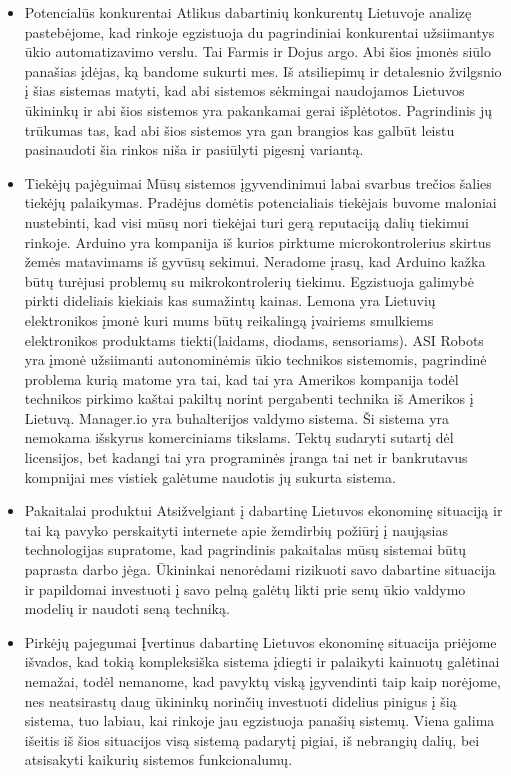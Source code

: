 \documentclass[oneside]{VUMIFPSkursinis}
\begin{document}
	\begin{itemize}
		\item{Potencialūs konkurentai}
Atlikus dabartinių konkurentų Lietuvoje analizę pastebėjome, kad rinkoje egzistuoja du pagrindiniai konkurentai užsiimantys ūkio automatizavimo verslu. Tai Farmis ir Dojus argo. Abi šios įmonės siūlo panašias įdėjas, ką bandome sukurti mes. Iš atsiliepimų ir detalesnio žvilgsnio į šias sistemas matyti, kad abi sistemos sėkmingai naudojamos Lietuvos ūkininkų ir abi šios sistemos yra pakankamai gerai išplėtotos. Pagrindinis jų trūkumas tas, kad abi šios sistemos yra gan brangios kas galbūt leistu pasinaudoti šia rinkos niša ir pasiūlyti pigesnį variantą.
		\item{Tiekėjų pajėguimai}
Mūsų sistemos įgyvendinimui labai svarbus trečios šalies tiekėjų palaikymas. Pradėjus domėtis potencialiais tiekėjais buvome maloniai nustebinti, kad visi mūsų nori tiekėjai turi gerą reputaciją dalių tiekimui rinkoje. Arduino yra kompanija iš kurios pirktume microkontrolerius skirtus žemės matavimams iš gyvūsų sekimui. Neradome įrasų, kad Arduino kažka būtų turėjusi problemų su mikrokontrolerių tiekimu. Egzistuoja galimybė pirkti dideliais kiekiais kas sumažintų kainas. Lemona yra Lietuvių elektronikos įmonė kuri mums būtų reikalingą įvairiems smulkiems elektronikos produktams tiekti(laidams, diodams, sensoriams). ASI Robots yra įmonė užsiimanti autonominėmis ūkio technikos sistemomis, pagrindinė problema kurią matome yra tai, kad tai yra Amerikos kompanija todėl technikos pirkimo kaštai pakiltų norint pergabenti technika iš Amerikos į Lietuvą. Manager.io yra buhalterijos valdymo sistema. Ši sistema yra nemokama išskyrus komerciniams tikslams. Tektų sudaryti sutartį dėl licensijos, bet kadangi tai yra programinės įranga tai net ir bankrutavus kompnijai mes vistiek galėtume naudotis jų sukurta sistema.
		\item{Pakaitalai produktui}
Atsižvelgiant į dabartinę Lietuvos ekonominę situaciją ir tai ką pavyko perskaityti internete apie žemdirbių požiūrį į naująsias technologijas supratome, kad pagrindinis pakaitalas mūsų sistemai būtų paprasta darbo jėga. Ūkininkai nenorėdami rizikuoti savo dabartine situacija ir papildomai investuoti į savo pelną galėtų likti prie senų ūkio valdymo modelių ir naudoti seną techniką.
		\item{Pirkėjų pajegumai}
Įvertinus dabartinę Lietuvos ekonominę situacija priėjome išvados, kad tokią kompleksiška sistema įdiegti ir palaikyti kainuotų galėtinai nemažai, todėl nemanome, kad pavyktų viską įgyvendinti taip kaip norėjome, nes neatsirastų daug ūkininkų norinčių investuoti didelius pinigus į šią sistema, tuo labiau, kai rinkoje jau egzistuoja panašių sistemų. Viena galima išeitis iš šios situacijos visą sistemą padarytį pigiai, iš nebrangių dalių, bei atsisakyti kaikurių sistemos funkcionalumų.

\end{itemize}
\end{document}
